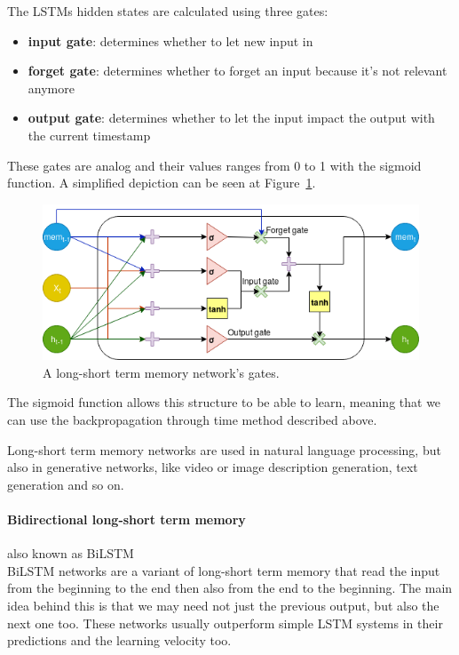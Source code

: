 \begin{minipage}{\textwidth}
	The LSTMs hidden states are calculated using three gates:
	\begin{itemize}
		\item \textbf{input gate}: determines whether to let new input in
		\item \textbf{forget gate}: determines whether to forget an input because it's not relevant anymore
		\item \textbf{output gate}: determines whether to let the input impact the output with the current timestamp
	\end{itemize}
\end{minipage}

These gates are analog and their values ranges from 0 to 1 with the sigmoid function. A simplified depiction can be seen at Figure~\ref{fig:lstm}.
\begin{figure}[!ht]
	\centering
	\includegraphics[width=125mm, keepaspectratio]{figures/lstm.png}
	\caption{A long-short term memory network's gates.}
	\label{fig:lstm}
\end{figure}

The sigmoid function allows this structure to be able to learn, meaning that we can use the backpropagation through time method described above.

Long-short term memory networks are used in natural language processing, but also in generative networks, like video or image description generation, text generation and so on.

\paragraph*{Bidirectional long-short term memory} also known as BiLSTM\\
BiLSTM networks are a variant of long-short term memory that read the input from the beginning to the end then also from the end to the beginning. The main idea behind this is that we may need not just the previous output, but also the next one too. These networks usually outperform simple LSTM systems in their predictions and the learning velocity too.

